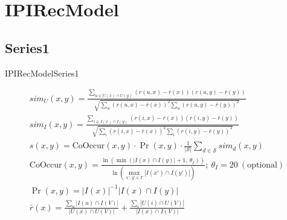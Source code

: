 
\section{IPIRecModel}
\subsection{Series1}
\begin{algorithm}
    \caption{IPIRecModelSeries1}
\begin{algorithmic}
    \State{}
\EndFunction{}
\State{}
\EndFunction{}
\end{algorithmic}
\end{algorithm}
\begin{gather}
sim_{U}(x,y)=
    \frac{\sum_{u \in U(x) \cap U(y)}(r(u,x)-\bar{r}(x))(r(u,y)-\bar{r}(y))}
    {\sqrt{\sum_{u}(r(u,x)-\bar{r}(x))^{2}\sum_{u}(r(u,y)-\bar{r}(y))^{2}}} \label{eq:pcc_co_occur_items} \\
sim_{I}(x,y)=\frac{\sum_{i \in I(x) \cap I(y)}(r(i,x)-\bar{r}(x))(r(i,y)-\bar{r}(y))}{\sqrt{\sum_{i}(r(i,x)-\bar{r}(x))^{2}\sum_{i}(r(i,y)-\bar{r}(y))^{2}}} \label{eq:pcc_co_occur_users} \\
s(x,y)=\text{CoOccur}(x,y)\cdot \Pr(x,y)\cdot \frac{1}{|\mathcal{S}|}\sum_{d \in \mathcal{S}}sim_{d}(x,y) \label{eq:tags_score} \\
\text{CoOccur}(x,y)=\frac{\ln(\min (|I(x) \cap I(y)| + 1,~ \theta_{I}))}{\ln(\max_{x', y' \in T} |I(x') \cap I(y')|)};~\theta_{I}=20~(\text{optional})\nonumber \\
\Pr(x,y)=|I(x)|^{-1}|I(x)\cap I(y)| \nonumber \\
\bar{r}(x)=\frac{\sum_{u} |I(u) \cap I(V)|}{|U(x) \cap U(V)|}+\frac{\sum_{i} |U(i) \cap U(V)|}{|I(x) \cap I(V)|} \nonumber
\end{gather}

\clearpage \newpage
